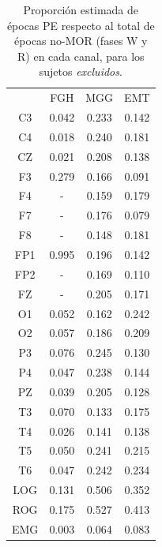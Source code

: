 \begin{table}
\centering
\begin{tabular}{c|ccc}
& FGH & MGG & EMT \\
 C3 & 0.042    & 0.233    & 0.142     \\
 C4 & 0.018    & 0.240    & 0.181     \\
 CZ & 0.021    & 0.208    & 0.138     \\
 F3 & 0.279    & 0.166    & 0.091     \\
 F4 & -      & 0.159    & 0.179     \\
 F7 & -      & 0.176    & 0.079     \\
 F8 & -      & 0.148    & 0.181     \\
 FP1 & 0.995    & 0.196    & 0.142     \\
 FP2 & -      & 0.169    & 0.110     \\
 FZ & -      & 0.205    & 0.171     \\
 O1 & 0.052    & 0.162    & 0.242     \\
 O2 & 0.057    & 0.186    & 0.209     \\
 P3 & 0.076    & 0.245    & 0.130     \\
 P4 & 0.047    & 0.238    & 0.144     \\
 PZ & 0.039    & 0.205    & 0.128     \\
 T3 & 0.070    & 0.133    & 0.175     \\
 T4 & 0.026    & 0.141    & 0.138     \\
 T5 & 0.050    & 0.241    & 0.215     \\
 T6 & 0.047    & 0.242    & 0.234     \\
 LOG & 0.131    & 0.506    & 0.352     \\
 ROG & 0.175    & 0.527    & 0.413     \\
 EMG & 0.003    & 0.064    & 0.083   
\end{tabular}
\caption{Proporci\'on estimada de \'epocas PE respecto al total de \'epocas
no-MOR (fases W y R) en cada
canal, para los sujetos \textit{excluidos}.}
\label{gpo_zz_nmor}
\end{table}

